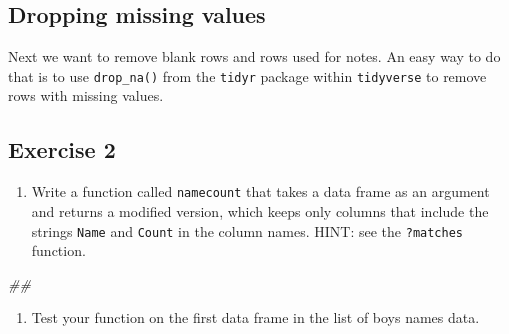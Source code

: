 \documentclass[]{book}
\newenvironment{Shaded}{\begin{snugshade}}{\end{snugshade}}
\newcommand{\CommentTok}[1]{\textcolor[rgb]{0.56,0.35,0.01}{\textit{#1}}}
\newcommand{\DecValTok}[1]{\textcolor[rgb]{0.00,0.00,0.81}{#1}}
\newcommand{\KeywordTok}[1]{\textcolor[rgb]{0.13,0.29,0.53}{\textbf{#1}}}
\newcommand{\NormalTok}[1]{#1}
\newcommand{\OperatorTok}[1]{\textcolor[rgb]{0.81,0.36,0.00}{\textbf{#1}}}
\newcommand{\StringTok}[1]{\textcolor[rgb]{0.31,0.60,0.02}{#1}}
\providecommand{\tightlist}{%
  \setlength{\itemsep}{0pt}\setlength{\parskip}{0pt}}
\begin{document}
\hypertarget{dropping-missing-values}{%
\subsection{Dropping missing values}\label{dropping-missing-values}}

Next we want to remove blank rows and rows used for notes. An easy way
to do that is to use \texttt{drop\_na()} from the \texttt{tidyr} package within \texttt{tidyverse}
to remove rows with missing values.

\begin{Shaded}
\end{Shaded}

\hypertarget{exercise-2-2}{%
\subsection{Exercise 2}\label{exercise-2-2}}

\begin{enumerate}
\def\labelenumi{\arabic{enumi}.}
\tightlist
\item
  Write a function called \texttt{namecount} that takes a data frame as an
  argument and returns a modified version, which keeps only columns that
  include the strings \texttt{Name} and \texttt{Count} in the column names.
  HINT: see the \texttt{?matches} function.
\end{enumerate}

\begin{Shaded}
\begin{Highlighting}[]
\CommentTok{## }
\end{Highlighting}
\end{Shaded}

\begin{enumerate}
\def\labelenumi{\arabic{enumi}.}
\setcounter{enumi}{1}
\tightlist
\item
  Test your function on the first data frame in the list of boys
  names data.
\end{enumerate}
\end{document}
